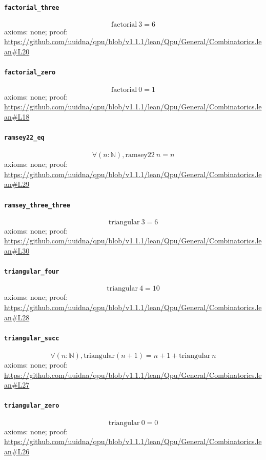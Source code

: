 \documentclass[11pt]{article}
\begin{document}
\paragraph{\texttt{factorial\_three}}
\[ \mathrm{factorial}\ 3 = 6 \]
\noindent axioms: none; proof: \url{https://github.com/uuidna/qpu/blob/v1.1.1/lean/Qpu/General/Combinatorics.lean\#L20}

\paragraph{\texttt{factorial\_zero}}
\[ \mathrm{factorial}\ 0 = 1 \]
\noindent axioms: none; proof: \url{https://github.com/uuidna/qpu/blob/v1.1.1/lean/Qpu/General/Combinatorics.lean\#L18}

\paragraph{\texttt{ramsey22\_eq}}
\[ \forall (n : \mathbb{N}), \mathrm{ramsey22}\ n = n \]
\noindent axioms: none; proof: \url{https://github.com/uuidna/qpu/blob/v1.1.1/lean/Qpu/General/Combinatorics.lean\#L29}

\paragraph{\texttt{ramsey\_three\_three}}
\[ \mathrm{triangular}\ 3 = 6 \]
\noindent axioms: none; proof: \url{https://github.com/uuidna/qpu/blob/v1.1.1/lean/Qpu/General/Combinatorics.lean\#L30}

\paragraph{\texttt{triangular\_four}}
\[ \mathrm{triangular}\ 4 = 10 \]
\noindent axioms: none; proof: \url{https://github.com/uuidna/qpu/blob/v1.1.1/lean/Qpu/General/Combinatorics.lean\#L28}

\paragraph{\texttt{triangular\_succ}}
\[ \forall (n : \mathbb{N}), \mathrm{triangular} (n + 1) = n + 1 + \mathrm{triangular}\ n \]
\noindent axioms: none; proof: \url{https://github.com/uuidna/qpu/blob/v1.1.1/lean/Qpu/General/Combinatorics.lean\#L27}

\paragraph{\texttt{triangular\_zero}}
\[ \mathrm{triangular}\ 0 = 0 \]
\noindent axioms: none; proof: \url{https://github.com/uuidna/qpu/blob/v1.1.1/lean/Qpu/General/Combinatorics.lean\#L26}
\end{document}
